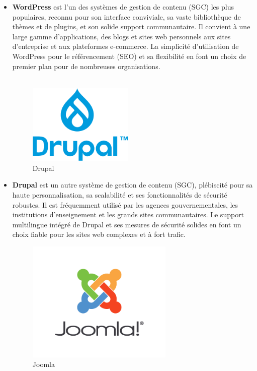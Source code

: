\begin{itemize}

\item \textbf{WordPress} est l'un des systèmes de gestion de contenu (SGC) les plus populaires, reconnu pour son interface conviviale, sa vaste bibliothèque de thèmes et de plugins, et son solide support communautaire. Il convient à une large gamme d'applications, des blogs et sites web personnels aux sites d'entreprise et aux plateformes e-commerce.  La simplicité d'utilisation de WordPress pour le référencement (SEO) et sa flexibilité en font un choix de premier plan pour de nombreuses organisations.
\\
\\ 
\begin{figure}[H] 
    \centering
    \includegraphics[width=5cm]{Figures/Drupal.png}
    \caption{Drupal}
    \label{fig:my_label} %
\end{figure}


\item \textbf{Drupal} est un autre système de gestion de contenu (SGC), plébiscité pour sa haute personnalisation, sa scalabilité et ses fonctionnalités de sécurité robustes. Il est fréquemment utilisé par les agences gouvernementales, les institutions d'enseignement et les grands sites communautaires. Le support multilingue intégré de Drupal et ses mesures de sécurité solides en font un choix fiable pour les sites web complexes et à fort trafic.

\begin{figure}[H] 
    \centering
    \includegraphics[width=7cm]{Figures/Joomla.png}
    \caption{Joomla}
    \label{fig:my_label} %
\end{figure}



\end{itemize}
